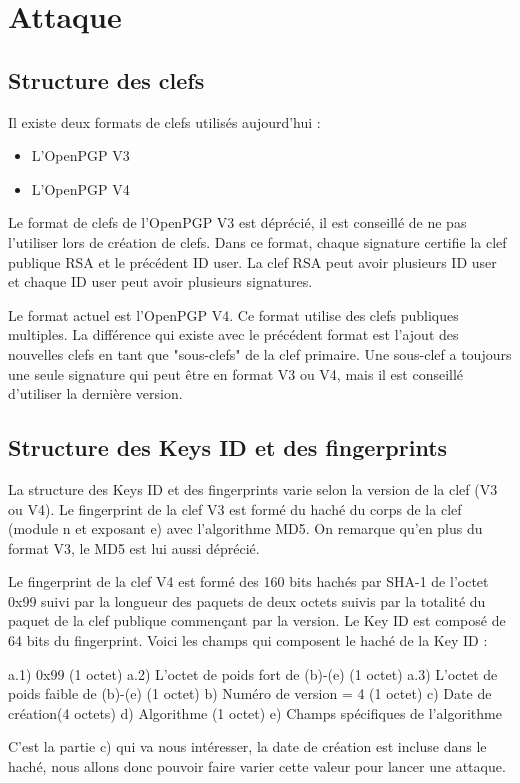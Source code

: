 \section{Attaque}
\subsection{Structure des clefs}

Il existe deux formats de clefs utilisés aujourd'hui : 
\begin{itemize}
\item L'OpenPGP V3
\item L'OpenPGP V4
\end{itemize}

Le format de clefs de l'OpenPGP V3 est déprécié, il est conseillé de ne pas l'utiliser lors de création de clefs. Dans ce format, chaque signature certifie la clef
publique RSA et le précédent ID user. La clef RSA peut avoir plusieurs ID user et chaque ID user peut avoir plusieurs signatures.

Le format actuel est l'OpenPGP V4. Ce format utilise des clefs publiques multiples. La différence qui existe avec le précédent format est l'ajout des nouvelles clefs
en tant que "sous-clefs" de la clef primaire.
Une sous-clef a toujours une seule signature qui peut être en format V3 ou V4, mais il est conseillé d'utiliser la dernière version.


\subsection{Structure des Keys ID et des fingerprints}

La structure des Keys ID et des fingerprints varie selon la version de la clef (V3 ou V4). 
Le fingerprint de la clef V3 est formé du haché du corps de la clef (module n et exposant e) avec l'algorithme MD5. On remarque qu'en plus du format V3, le MD5 
est lui aussi déprécié. 

Le fingerprint de la clef V4 est formé des 160 bits hachés par SHA-1 de l'octet 0x99 suivi par la longueur des paquets de deux octets suivis par la totalité du paquet
de la clef publique commençant par la version.
Le Key ID est composé de 64 bits du fingerprint.
Voici les champs qui composent le haché de la Key ID :

a.1) 0x99 (1 octet)
a.2) L'octet de poids fort de (b)-(e) (1 octet)
a.3) L'octet de poids faible de (b)-(e) (1 octet)
  b) Numéro de version = 4 (1 octet)
  c) Date de création(4 octets)
  d) Algorithme (1 octet)
  e) Champs spécifiques de l'algorithme


C'est la partie c) qui va nous intéresser, la date de création est incluse dans le haché, nous allons donc pouvoir faire varier cette valeur pour lancer une attaque.